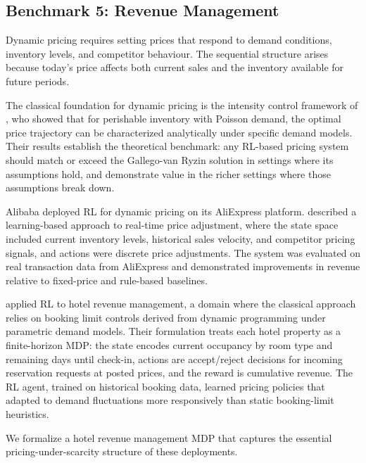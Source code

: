 \subsection{Benchmark 5: Revenue Management}
\label{sec:benchmark_hotel}

Dynamic pricing requires setting prices that respond to demand conditions, inventory levels, and competitor behaviour. The sequential structure arises because today's price affects both current sales and the inventory available for future periods.

The classical foundation for dynamic pricing is the intensity control framework of \citet{Gallego1994pricing}, who showed that for perishable inventory with Poisson demand, the optimal price trajectory can be characterized analytically under specific demand models. Their results establish the theoretical benchmark: any RL-based pricing system should match or exceed the Gallego-van Ryzin solution in settings where its assumptions hold, and demonstrate value in the richer settings where those assumptions break down.

Alibaba deployed RL for dynamic pricing on its AliExpress platform. \citet{Alibaba2019} described a learning-based approach to real-time price adjustment, where the state space included current inventory levels, historical sales velocity, and competitor pricing signals, and actions were discrete price adjustments. The system was evaluated on real transaction data from AliExpress and demonstrated improvements in revenue relative to fixed-price and rule-based baselines.

\citet{Chen2023hotelrl} applied RL to hotel revenue management, a domain where the classical approach relies on booking limit controls derived from dynamic programming under parametric demand models. Their formulation treats each hotel property as a finite-horizon MDP: the state encodes current occupancy by room type and remaining days until check-in, actions are accept/reject decisions for incoming reservation requests at posted prices, and the reward is cumulative revenue. The RL agent, trained on historical booking data, learned pricing policies that adapted to demand fluctuations more responsively than static booking-limit heuristics.

We formalize a hotel revenue management MDP that captures the essential pricing-under-scarcity structure of these deployments.

